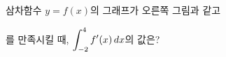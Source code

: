 \noindent\begin{minipage}[t]{0.58\linewidth}\vspace{0pt}\raggedright 삼차함수 $y=f(x)$의 그래프가 오른쪽 그림과 같고\par\smallskip\end{minipage}\hfill\begin{minipage}[t]{0.4\linewidth}\vspace{0pt}\centering \resizebox{\ifdim\width>\linewidth\linewidth\else\width\fi}{!}{}\end{minipage}\par
\noindent {}\par\smallskip\noindent 를 만족시킬 때, $\displaystyle\int_{-2}^{4}f'(x)\mkern3mu dx$의 값은?

